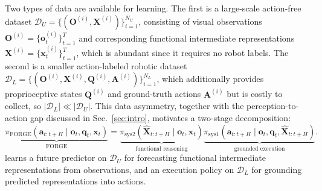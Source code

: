 
Two types of data are available for learning. The first is a large-scale action-free dataset $\mathcal{D}_{U}=\{(\mathbf{O}^{(i)}, \mathbf{X}^{(i)})\}_{i=1}^{N_U}$, consisting of visual observations $\mathbf{O}^{(i)}=\{\mathbf{o}^{(i)}_t\}_{t=1}^{T}$ and corresponding functional intermediate representations $\mathbf{X}^{(i)}=\{\mathbf{x}^{(i)}_t\}_{t=1}^{T}$, which is abundant since it requires no robot labels.
The second is a smaller action-labeled robotic dataset $\mathcal{D}_{L}=\{(\mathbf{O}^{(i)}, \mathbf{X}^{(i)}, \mathbf{Q}^{(i)}, \mathbf{A}^{(i)})\}_{i=1}^{N_L}$, which additionally provides proprioceptive states $\mathbf{Q}^{(i)}$ and ground-truth actions $\mathbf{A}^{(i)}$ but is costly to collect, so $|\mathcal{D}_L| \ll |\mathcal{D}_U|$. This data asymmetry, together with the perception-to-action gap discussed in Sec.~\ref{sec:intro}, motivates a two-stage decomposition: 
\begin{equation}
\underbrace{
\pi_{\mathrm{FORGE}}(
\mathbf{a}_{t:t+H} \mid \mathbf{o}_{t}, \mathbf{q}_{t}, \mathbf{x}_{t}
)
}_{\text{FORGE}}=
\underbrace{
\pi_{\mathrm{sys2}}(
\hat{\mathbf{X}}_{t:t+H} \mid \mathbf{o}_{t}, \mathbf{x}_{t}
)
}_{\text{functional reasoning}}
\underbrace{
\pi_{\mathrm{sys1}}(
\mathbf{a}_{t:t+H} \mid \mathbf{o}_{t}, \mathbf{q}_{t}, \hat{\mathbf{X}}_{t:t+H}
)
}_{\text{grounded execution}} .
\label{eq:forge_decomposition}
\end{equation}
\algoname{} learns a future predictor on $\mathcal{D}_U$ for forecasting functional intermediate representations from observations, and an execution policy on $\mathcal{D}_L$ for grounding predicted representations into actions.

